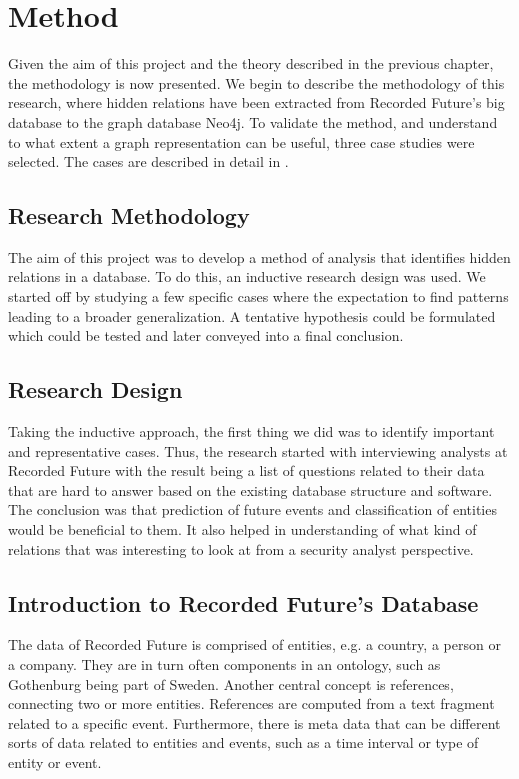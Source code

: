 \chapter{Method}
Given the aim of this project and the theory described in the previous chapter, the methodology is now presented. We begin to describe the methodology of this research, where hidden relations have been extracted from Recorded Future's big database to the graph database Neo4j. To validate the method, and understand to what extent a graph representation can be useful, three case studies were selected. The cases are described in detail in .

\section{Research Methodology}
The aim of this project was to develop a method of analysis that identifies hidden relations in a database. To do this, an inductive research design was used. We started off by studying a few specific cases where the expectation to find patterns leading to a broader generalization. A tentative hypothesis could be formulated which could be tested and later conveyed into a final conclusion.

\section{Research Design}
Taking the inductive approach, the first thing we did was to identify important and representative cases. Thus, the research started with interviewing analysts at Recorded Future with the result being a list of questions related to their data that are hard to answer based on the existing database structure and software. The conclusion was that prediction of future events and classification of entities would be beneficial to them. It also helped in understanding of what kind of relations that was interesting to look at from a security analyst perspective.

\section{Introduction to Recorded Future's Database \label{dataset}}
The data of Recorded Future is comprised of entities, e.g. a country, a person or a company. They are in turn often components in an ontology, such as Gothenburg being part of Sweden. Another central concept is references, connecting two or more entities. References are computed from a text fragment related to a specific event. Furthermore, there is meta data that can be different sorts of data related to entities and events, such as a time interval or type of entity or event.


